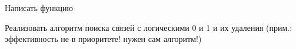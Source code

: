 
\begin{DoxyRefList}
\item[\label{todo__todo000003}%
\hypertarget{todo__todo000003}{}%
Член \hyperlink{class_graph_a675ba6677488ad224ff32d0fde0644c5}{Graph\+:\+:build\+Bdd} (int values, int variables)]Написать функцию  
\item[\label{todo__todo000002}%
\hypertarget{todo__todo000002}{}%
Член \hyperlink{class_graph_a902c5b3eacb66d60752525ab23297a95}{Graph\+:\+:$\sim$\+Graph} ()]Реализовать алгоритм поиска связей с логическими 0 и 1 и их удаления (прим.\+: эффективность не в приоритете! нужен сам алгоритм!) 
\end{DoxyRefList}